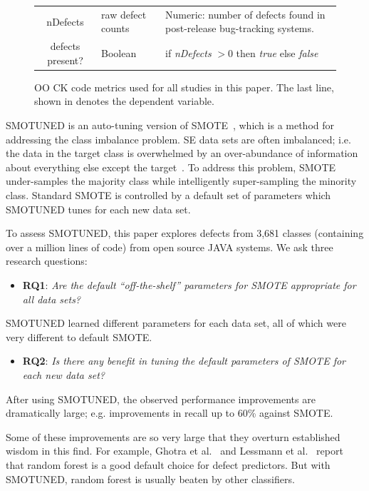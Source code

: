 \documentclass[10pt,conference]{IEEEtran}
\newcommand{\bi}{\begin{itemize}[leftmargin=0.4cm]}
\newcommand{\ei}{\end{itemize}}
\theoremstyle{break}
\theoremstyle{break}
\newcommand{\sma}{{\sc SMOTE}}
\newcommand{\smb}{{\sc SMOTUNED}}
\begin{document}
\begin{figure}[!t]
\begin{center}
{\begin{tabular}{c|l|p{4.0in}}
nDefects & raw defect counts & Numeric: number of defects found in post-release bug-tracking systems.\\
\rowcolor{lightgray}
defects present? & Boolean& if {\em nDefects} $>0$ then {\em true} else {\em false}
\end{tabular}
}
\end{center}
\caption{OO CK code metrics used for all studies in this paper.
The last line, shown in denotes the dependent variable.}
\label{fig:ck}
\vspace{-0.7cm}
\end{figure}


{\smb} is an auto-tuning version of  {\sma}~\cite{chawla2002smote}, which is
a method for addressing the class imbalance problem. SE data
sets are often imbalanced; i.e. the data in the target class is overwhelmed by an over-abundance of information about everything else except the target~\cite{menzies2007problems}. To
address this problem, {\sma} under-samples
the majority class while intelligently super-sampling  the minority class. Standard
{\sma} is controlled by a default
set of parameters which {\smb} tunes 
for each new data set. 

To assess {\smb}, this paper explores defects from  3,681	 classes (containing over a million lines of code) from open source JAVA systems. We ask three research questions: 
 \bi\item
  \textbf{RQ1}:  {\em Are the default ``off-the-shelf'' parameters for {\sma} appropriate for
  all data sets?} 
  \ei
 \begin{lesson}{\smb} learned different parameters for each data set, all of which  were very different to default {\sma}.
 \end{lesson}
  \bi
  \item
  \textbf{RQ2}: {\em   Is  there any benefit in tuning the default parameters of {\sma} for
  each new data set?} 
  \ei
   \begin{lesson}After using {\smb}, the observed performance improvements are dramatically large; e.g. improvements in recall  up to 60\% against {\sma}.
 \end{lesson}
Some of these improvements are so very large that they overturn established wisdom in this find.
For example,  Ghotra et al.~\cite{ghotra2015revisiting} and Lessmann et al.~\cite{lessmann2008benchmarking}
 report that   random forest is a  good default choice for  defect predictors.
But with  {\smb}, random forest is usually
beaten by other classifiers. 
\end{document}
